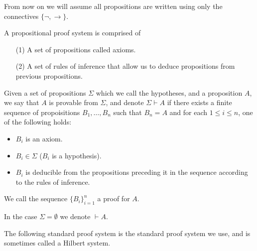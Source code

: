\documentclass[11pt,a4paper]{article}
\renewcommand{\implies}{\rightarrow}
\begin{document}
  From now on we will assume all propositions are written using only 
  the connectives $\{\neg, \implies\}$.

  \begin{definition}
    A propositional proof system is comprised of
    \begin{enumerate}
      \item[(1)] A set of propositions called axioms.
      \item[(2)] A set of rules of inference that allow us to deduce
        propositions from previous propositions.
    \end{enumerate}
  \end{definition}

  \begin{definition}[Proof]
    Given a set of propositions $\Sigma$ which we call the hypotheses,
    and a proposition $A$, we say that $A$ is provable from $\Sigma$,
    and denote $\Sigma \vdash A$
    if there exists a finite sequence of propoisitions $B_1,\dots,B_n$
    such that $B_n = A$ and for each $1 \le i \le n$, one of the
    following holds:

    \begin{itemize}
      \item $B_i$ is an axiom.
      \item $B_i \in \Sigma$ ($B_i$ is a hypothesis).
      \item $B_i$ is deducible from the propositions preceding it in the 
        sequence according to the rules of inference.
    \end{itemize}

    We call the sequence $\{B_i\}_{i=1}^{n}$ a proof for $A$.
  \end{definition}
  \begin{remark}
    In the case $\Sigma = \emptyset$ we denote $\vdash A$.
  \end{remark}

  The following standard proof system is the standard proof system we
  use, and is sometimes called a Hilbert system.
\end{document}
